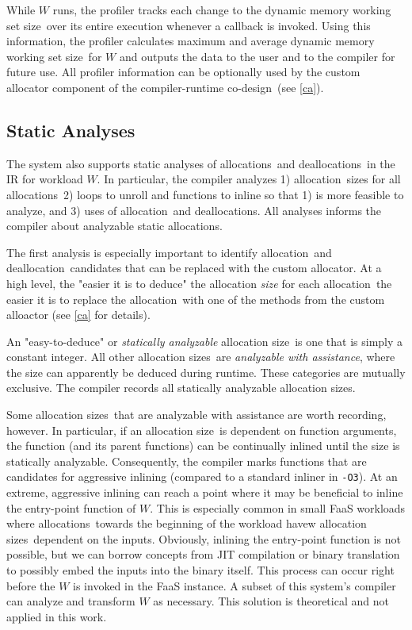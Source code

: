 \documentclass{article}
\def\crcd{compiler-runtime co-design}
\def\ALL{allocation}
\def\DALL{deallocation}
\def\ALLS{allocations}
\def\DALLS{deallocations}
\def\DWS{dynamic memory working set size}
\def\SIZE{allocation size}
\def\SIZES{allocation sizes}
\begin{document}
While $W$ runs, the profiler tracks each change to the \DWS\ over its entire execution 
whenever a callback is invoked. Using this information, the profiler calculates maximum 
and average \DWS\ for $W$ and outputs the data to the user and to the compiler for future 
use. All profiler information can be optionally used by the custom allocator component of
the \crcd\ (see \ref{ca}).

\subsection{Static Analyses}
The system also supports static analyses of \ALLS\ and \DALLS\ in the IR for workload $W$. 
In particular, the compiler analyzes 1) \ALL\ sizes for all \ALLS\, 2) loops to unroll 
and functions to inline so that 1) is more feasible to analyze, and 3) uses of \ALL\ and 
\DALLS . All analyses informs the compiler about analyzable static allocations. 

The first analysis is especially important to identify \ALL\ and \DALL\ candidates that
can be replaced with the custom allocator. At a high level, the "easier it is to deduce"
the allocation \textit{size} for each \ALL\, the easier it is to replace the \ALL\ with one
of the methods from the custom alloactor (see \ref{ca} for details).

An "easy-to-deduce" or \textit{statically analyzable} \SIZE\ is one that is 
simply a constant integer. All other \SIZES\ are \textit{analyzable with
assistance}, where the size can apparently be deduced during runtime. These 
categories are mutually exclusive. The compiler records all statically analyzable 
\SIZES .

Some \SIZES\ that are analyzable with assistance are worth recording, however. In
particular, if an \SIZE\ is dependent on function arguments, the function (and
its parent functions) can be continually inlined until the size is statically
analyzable. Consequently, the compiler marks functions that are candidates for
aggressive inlining (compared to a standard inliner in \texttt{-O3}). At an
extreme, aggressive inlining can reach a point where it may be beneficial to
inline the entry-point function of $W$. This is especially common in small 
FaaS workloads where \ALLS\ towards the beginning of the workload havew \SIZES\
dependent on the inputs. Obviously, inlining the entry-point function is not 
possible, but we can borrow concepts from JIT compilation or binary translation
to possibly embed the inputs into the binary itself. This process can occur
right before the $W$ is invoked in the FaaS instance. A subset of this system's compiler
can analyze and transform $W$ as necessary. This solution is theoretical and 
not applied in this work.
\end{document}
